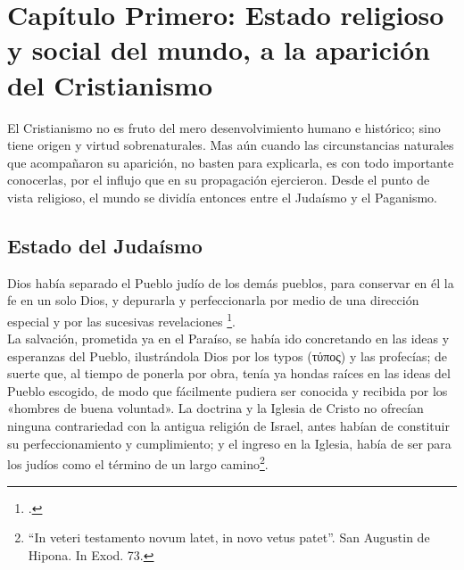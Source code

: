 \raggedbottom{} \documentclass[12pt, a4paper, openany]{book} %
\begin{document}
\chapter{Capítulo Primero: Estado religioso y social del mundo, a la aparición del Cristianismo}
El Cristianismo no es fruto del mero desenvolvimiento humano e histórico; sino tiene origen y virtud sobrenaturales. Mas aún cuando las circunstancias naturales que acompañaron su aparición, no basten para explicarla, es con todo importante conocerlas, por el influjo que en su propagación ejercieron. Desde el punto de vista religioso, el mundo se dividía entonces entre el Judaísmo y el Paganismo.
\section{Estado del Judaísmo}
Dios había separado el Pueblo judío de los demás pueblos, para conservar en él la fe en un solo Dios, y depurarla y perfeccionarla por medio de una dirección especial y por las sucesivas revelaciones \footcites{Flavius1856Opera}{Schurer1910Geschichte}. \\
La salvación, prometida ya en el Paraíso, se había ido concretando en las ideas y esperanzas del Pueblo, ilustrándola Dios por los typos (\textgreek{τύπος}) y las profecías; de suerte que, al tiempo de ponerla por obra, tenía ya hondas raíces en las ideas del Pueblo escogido, de modo que fácilmente pudiera ser conocida y recibida por los «hombres de buena voluntad». La doctrina y la Iglesia de Cristo no ofrecían ninguna contrariedad con la antigua religión de Israel, antes habían de constituir su perfeccionamiento y cumplimiento; y el ingreso en la Iglesia, había de ser para los judíos como el término de un largo camino\textdagger\footnote{``In veteri testamento novum latet, in novo vetus patet''. San Augustin de Hipona. In Exod. 73.}.
\end{document}
